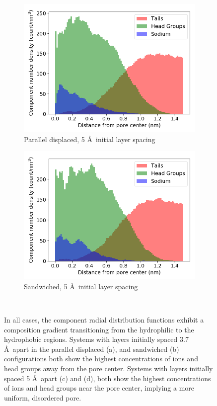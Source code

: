 \documentclass{article}
\begin{document}
\begin{figure}
\begin{subfigure}{0.45\textwidth}
        \includegraphics[width=1\linewidth]{disordered_offset_density.png}
        \caption{Parallel displaced, 5 \AA~initial layer spacing}
        \label{fig:disordered_offset_density}
  \end{subfigure}
  \begin{subfigure}{0.45\textwidth}
        \includegraphics[width=1\linewidth]{disordered_density.png}
        \caption{Sandwiched, 5 \AA~initial layer spacing}
        \label{fig:disorder_layered_density}
  \end{subfigure}
  \caption{In all cases, the component radial distribution functions exhibit a
	  composition gradient transitioning from the hydrophilic to the hydrophobic
	  regions. Systems with layers initially spaced 3.7 \AA~apart in the  parallel
	  displaced (a), and sandwiched (b) configurations both show the highest
	  concentrations of ions and head groups away from the pore center. Systems with
	  layers initially spaced 5 \AA~apart (c) and (d), both show the highest
	  concentrations of ions and head groups near the pore center, implying a more
	  uniform, disordered pore.}~\label{fig:densities}
  \end{figure}
\end{document}
